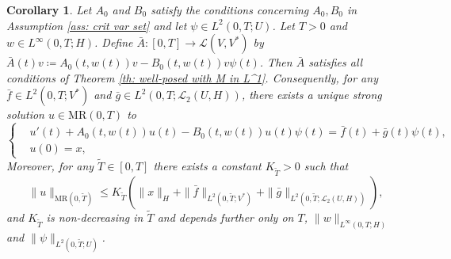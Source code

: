 \documentclass{amsart}
\renewcommand{\MR}{\mathrm{MR}}
\newcommand{\UH}{\mathcal{L}_2(U,H)}
\newcommand{\<}{\langle}
\newcommand{\?}{\rangle}
\theoremstyle{plain}
\theoremstyle{remark}
\theoremstyle{plain}
\newtheorem{corollary}[theorem]{Corollary}
\numberwithin{equation}{section}
\begin{document}
\begin{corollary}\label{cor: skeleton MR linearized crit var setting}
Let $A_0$ and $B_0$ satisfy the conditions concerning $A_0,B_0$ in Assumption \ref{ass: crit var set} and let $\psi\in L^2(0,T;U)$.
Let $T>0$ and $w\in L^\infty(0,T;H)$.
Define $\bar{A}\colon [0,T]\to\mathcal{L}(V,V^*)$ by $\bar{A}(t)v\coloneqq  A_0(t,w(t))v-B_0(t,w(t))v\psi(t)$.
Then $\bar{A}$ satisfies all conditions of Theorem \ref{th: well-posed with M in L^1}. Consequently, for any $\bar{f}\in L^2(0,T;V^*)$ and $\bar{g}\in L^2(0,T;\UH)$, there exists a unique strong solution  $u\in \MR(0,T)$ to
\begin{equation*}
\begin{cases}
    &u'(t)+A_0(t,w(t))u(t)-B_0(t,w(t))u(t)\psi(t)=\bar{f}(t)+\bar{g}(t)\psi(t), \\
    &u(0)=x,
\end{cases}
\end{equation*}
Moreover, for any $\tilde{T}\in[0,T]$ there exists a constant $K_{\tilde{T}}>0$ such that
 \begin{equation}\label{def: maxreg}
 \|u\|_{\MR(0,\tilde{T})}\leq K_{\tilde{T}}\left(\|x\|_H+\|\bar{f}\|_{L^2(0,\tilde{T};V^*)} +\|\bar{g}\|_{L^2(0,\tilde{T};\UH)}\right),
 \end{equation}
and $K_{\tilde{T}}$ is non-decreasing in $\tilde{T}$ and depends further only on $T$, $\|w\|_{L^\infty(0,T;H)}$ and $\|\psi\|_{L^2(0,\tilde{T};U)}$.
\end{corollary}
\end{document}
